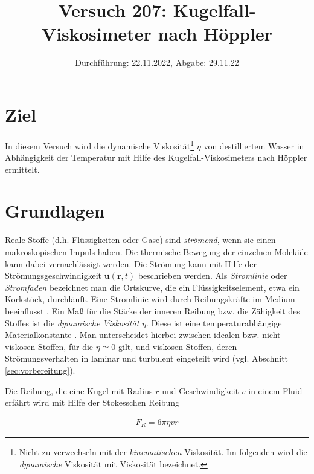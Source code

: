 

\title{Versuch 207: Kugelfall-Viskosimeter nach Höppler}
\date{Durchführung: 22.11.2022, Abgabe: 29.11.22}



\maketitle

\tableofcontents
\newpage



\section{Ziel}
In diesem Versuch wird die dynamische Viskosität\footnote{Nicht zu verwechseln mit der \textit{kinematischen} Viskosität.
Im folgenden wird die \textit{dynamische} Viskosität mit Viskosität bezeichnet.} $\eta$ 
von destilliertem Wasser in Abhängigkeit der Temperatur mit Hilfe des Kugelfall-Viskosimeters nach Höppler ermittelt.



\section{Grundlagen}
\label{sec:grundlagen}
Reale Stoffe (d.h. Flüssigkeiten oder Gase) sind \textit{strömend}, wenn sie einen makroskopischen Impuls haben.
Die thermische Bewegung der einzelnen Moleküle kann dabei vernachlässigt werden.
Die Strömung kann mit Hilfe der Strömungsgeschwindigkeit $\symbf{u}\left(\symbf{r},t\right)$ beschrieben werden.
Als \textit{Stromlinie} oder \textit{Stromfaden} bezeichnet man die Ortskurve, die ein Flüssigkeitselement, etwa ein Korkstück, durchläuft.
Eine Stromlinie wird durch Reibungskräfte im Medium beeinflusst \cite*[]{demtroeder}.
Ein Maß für die Stärke der inneren Reibung bzw. die Zähigkeit des Stoffes ist die \textit{dynamische Viskosität} $\eta$.
Diese ist eine temperaturabhängige Materialkonstante \cite*[]{geschke}.
Man unterscheidet hierbei zwischen idealen bzw. nicht-viskosen Stoffen, für die $\eta \simeq 0$ gilt, und viskosen Stoffen,
deren Strömungsverhalten in laminar und turbulent eingeteilt wird (vgl. Abschnitt \ref{sec:vorbereitung}).

Die Reibung, die eine Kugel mit Radius $r$ und Geschwindigkeit $v$ in einem Fluid erfährt wird mit Hilfe der Stokesschen Reibung 

\begin{align}
    F_R = 6 \pi \eta v r    
\end{align}

